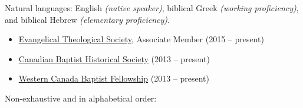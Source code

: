 \documentclass[10pt,letterpaper]{article} %
\begin{document}

\inlineheadsection %
{Natural languages:}
{English \textit{(native speaker)}, biblical Greek \textit{(working proficiency)}, and biblical Hebrew \textit{(elementary proficiency)}.}


\spacedhrule{1.6em}{-0.4em} %



\begin{itemize}
\item \href{http://www.etsjets.org/}{Evangelical Theological Society}, Associate Member (2015 -- present)
\item \href{https://www.facebook.com/canadianbaptisthistory}{Canadian Baptist Historical Society} (2013 -- present)
\item \href{http://wcbf.net/}{Western Canada Baptist Fellowship} (2013 -- present)
\end{itemize}



\spacedhrule{1.6em}{-0.4em} %



\inlineheadsection %
{Non-exhaustive and in alphabetical order:}
{

}

\end{document}
